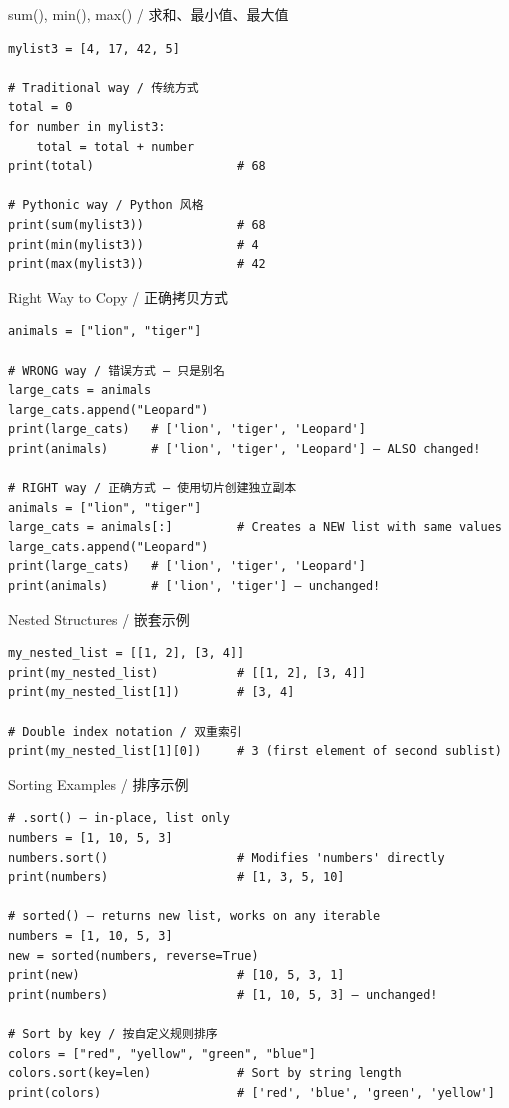 \documentclass[11pt,a4paper]{report}
\begin{document}
\begin{examplebox}{sum(), min(), max() / 求和、最小值、最大值}
\begin{lstlisting}
mylist3 = [4, 17, 42, 5]

# Traditional way / 传统方式
total = 0
for number in mylist3:
    total = total + number
print(total)                    # 68

# Pythonic way / Python 风格
print(sum(mylist3))             # 68
print(min(mylist3))             # 4
print(max(mylist3))             # 42
\end{lstlisting}
\end{examplebox}

\begin{examplebox}{Right Way to Copy / 正确拷贝方式}
\begin{lstlisting}
animals = ["lion", "tiger"]

# WRONG way / 错误方式 — 只是别名
large_cats = animals
large_cats.append("Leopard")
print(large_cats)   # ['lion', 'tiger', 'Leopard']
print(animals)      # ['lion', 'tiger', 'Leopard'] — ALSO changed!

# RIGHT way / 正确方式 — 使用切片创建独立副本
animals = ["lion", "tiger"]
large_cats = animals[:]         # Creates a NEW list with same values
large_cats.append("Leopard")
print(large_cats)   # ['lion', 'tiger', 'Leopard']
print(animals)      # ['lion', 'tiger'] — unchanged!
\end{lstlisting}
\end{examplebox}

\begin{examplebox}{Nested Structures / 嵌套示例}
\begin{lstlisting}
my_nested_list = [[1, 2], [3, 4]]
print(my_nested_list)           # [[1, 2], [3, 4]]
print(my_nested_list[1])        # [3, 4]

# Double index notation / 双重索引
print(my_nested_list[1][0])     # 3 (first element of second sublist)
\end{lstlisting}
\end{examplebox}

\begin{examplebox}{Sorting Examples / 排序示例}
\begin{lstlisting}
# .sort() — in-place, list only
numbers = [1, 10, 5, 3]
numbers.sort()                  # Modifies 'numbers' directly
print(numbers)                  # [1, 3, 5, 10]

# sorted() — returns new list, works on any iterable
numbers = [1, 10, 5, 3]
new = sorted(numbers, reverse=True)
print(new)                      # [10, 5, 3, 1]
print(numbers)                  # [1, 10, 5, 3] — unchanged!

# Sort by key / 按自定义规则排序
colors = ["red", "yellow", "green", "blue"]
colors.sort(key=len)            # Sort by string length
print(colors)                   # ['red', 'blue', 'green', 'yellow']
\end{lstlisting}
\end{examplebox}
\end{document}
